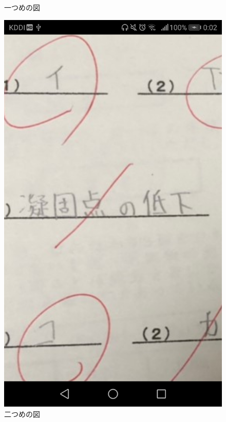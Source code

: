 \documentclass[11pt]{jsarticle}
\begin{document}
\begin{figure}[htbp]
\begin{minipage}{0.33\hsize}
\begin{center}
  \end{center}
  \caption{一つめの図}
  \label{fig:one}
 \end{minipage}
 \begin{minipage}{0.33\hsize}
 \begin{center}
  \includegraphics[scale=0.1]{pic2.jpg}
 \end{center}
  \caption{二つめの図}
  \label{fig:two}
 \end{minipage}
 \begin{minipage}{0.33\hsize}

\end{minipage}
\end{figure}
\end{document}
